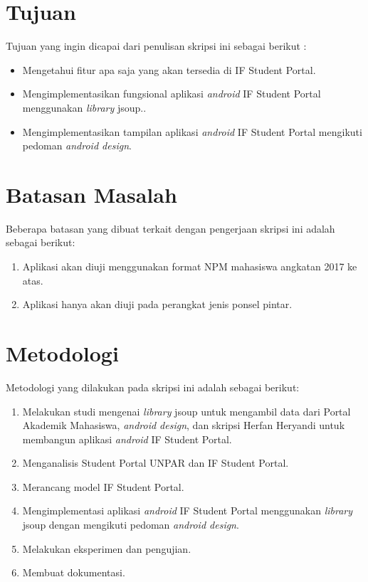 \section{Tujuan}
\label{sec:tujuan}
Tujuan yang ingin dicapai dari penulisan skripsi ini sebagai berikut :
\begin{itemize}
    \item Mengetahui fitur apa saja yang akan tersedia di IF Student Portal.
    \item Mengimplementasikan fungsional aplikasi \textit{android} IF Student Portal menggunakan \textit{library} jsoup..
    \item Mengimplementasikan tampilan aplikasi \textit{android} IF Student Portal mengikuti pedoman \textit{android design}.
    
\end{itemize}

\section{Batasan Masalah}
\label{sec:batasan}
Beberapa batasan yang dibuat terkait dengan pengerjaan skripsi ini adalah sebagai berikut:
\begin{enumerate}
	\item Aplikasi akan diuji menggunakan format NPM mahasiswa angkatan 2017 ke atas.
	\item Aplikasi hanya akan diuji pada perangkat jenis ponsel pintar.

\end{enumerate}

\section{Metodologi}
\label{sec:metlit}
Metodologi yang dilakukan pada skripsi ini adalah sebagai berikut:

\begin{enumerate}
	\item Melakukan studi mengenai \textit{library} jsoup untuk mengambil data dari Portal Akademik Mahasiswa, \textit{android design}, dan skripsi Herfan Heryandi untuk membangun aplikasi \textit{android} IF Student Portal.
	\item Menganalisis Student Portal UNPAR dan IF Student Portal.
	\item Merancang model IF Student Portal.
	\item Mengimplementasi aplikasi \textit{android} IF Student Portal menggunakan \textit{library} jsoup dengan mengikuti pedoman \textit{android design}.
	\item Melakukan eksperimen dan pengujian.
	\item Membuat dokumentasi.
\end{enumerate}



